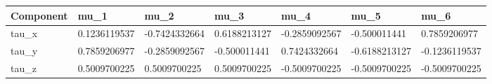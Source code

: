 \begin{tabular}{@{}lllllll@{}}
\toprule
Component & mu\_1 & mu\_2 & mu\_3 & mu\_4 & mu\_5 & mu\_6 \\
\midrule
tau\_x & 0.1236119537 & -0.7424332664 & 0.6188213127 & -0.2859092567 & -0.500011441 & 0.7859206977 \\
tau\_y & 0.7859206977 & -0.2859092567 & -0.500011441 & 0.7424332664 & -0.6188213127 & -0.1236119537 \\
tau\_z & 0.5009700225 & 0.5009700225 & 0.5009700225 & -0.5009700225 & -0.5009700225 & -0.5009700225 \\
\bottomrule
\end{tabular}
